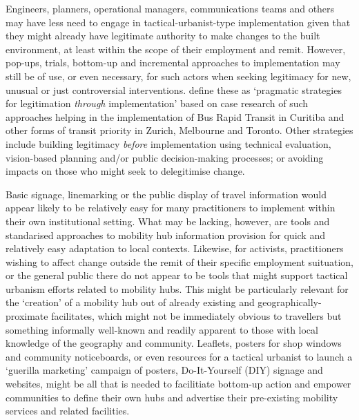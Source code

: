 \documentclass[preprint, 3p,
authoryear]{elsarticle} %
\begin{document}
Engineers, planners, operational managers, communications teams and
others may have less need to engage in tactical-urbanist-type
implementation given that they might already have legitimate authority
to make changes to the built environment, at least within the scope of
their employment and remit. However, pop-ups, trials, bottom-up and
incremental approaches to implementation may still be of use, or even
necessary, for such actors when seeking legitimacy for new, unusual or
just controversial interventions.
\citet{Reynolds:2020aa,Reynolds:2021ab} define these as `pragmatic
strategies for legitimation \emph{through} implementation' based on case
research of such approaches helping in the implementation of Bus Rapid
Transit in Curitiba and other forms of transit priority in Zurich,
Melbourne and Toronto. Other strategies include building legitimacy
\emph{before} implementation using technical evaluation, vision-based
planning and/or public decision-making processes; or avoiding impacts on
those who might seek to delegitimise change.

Basic signage, linemarking or the public display of travel information
would appear likely to be relatively easy for many practitioners to
implement within their own institutional setting. What may be lacking,
however, are tools and standarised approaches to mobility hub
information provision for quick and relatively easy adaptation to local
contexts. Likewise, for activists, practitioners wishing to affect
change outside the remit of their specific employment suituation, or the
general public there do not appear to be tools that might support
tactical urbanism efforts related to mobility hubs. This might be
particularly relevant for the `creation' of a mobility hub out of
already existing and geographically-proximate facilitates, which might
not be immediately obvious to travellers but something informally
well-known and readily apparent to those with local knowledge of the
geography and community. Leaflets, posters for shop windows and
community noticeboards, or even resources for a tactical urbanist to
launch a `guerilla marketing' campaign of posters, Do-It-Yourself (DIY)
signage and websites, might be all that is needed to facilitiate
bottom-up action and empower communities to define their own hubs and
advertise their pre-existing mobility services and related facilities.
\end{document}
